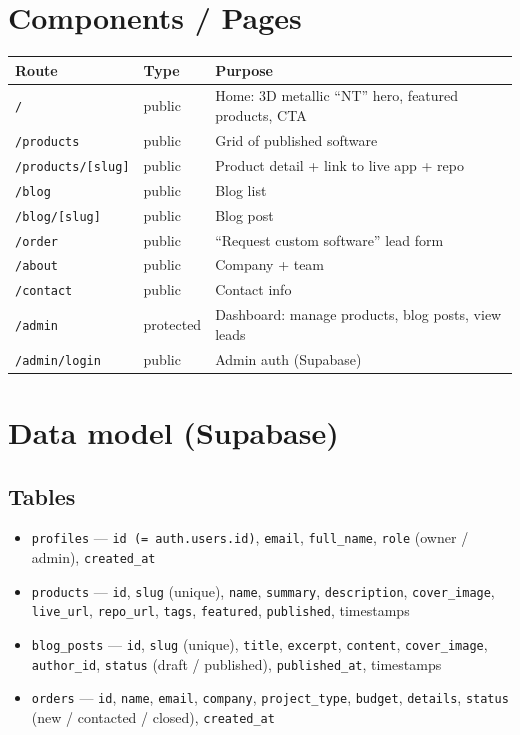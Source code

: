 \documentclass[11pt,a4paper]{article}
\begin{document}
\section{Components / Pages}
\begin{center}
\begin{tabularx}{\textwidth}{l l Y}
\toprule
\textbf{Route} & \textbf{Type} & \textbf{Purpose}\\
\midrule
\texttt{/} & public & Home: 3D metallic ``NT'' hero, featured products, CTA\\
\texttt{/products} & public & Grid of published software\\
\texttt{/products/[slug]} & public & Product detail + link to live app + repo\\
\texttt{/blog} & public & Blog list\\
\texttt{/blog/[slug]} & public & Blog post\\
\texttt{/order} & public & ``Request custom software'' lead form\\
\texttt{/about} & public & Company + team\\
\texttt{/contact} & public & Contact info\\
\texttt{/admin} & protected & Dashboard: manage products, blog posts, view leads\\
\texttt{/admin/login} & public & Admin auth (Supabase)\\
\bottomrule
\end{tabularx}
\end{center}

\section{Data model (Supabase)}
\subsection{Tables}
\begin{itemize}
  \item \texttt{profiles} --- \texttt{id (= auth.users.id)}, \texttt{email}, \texttt{full\_name},
        \texttt{role} (owner / admin), \texttt{created\_at}
  \item \texttt{products} --- \texttt{id}, \texttt{slug} (unique), \texttt{name}, \texttt{summary},
        \texttt{description}, \texttt{cover\_image}, \texttt{live\_url}, \texttt{repo\_url},
        \texttt{tags}, \texttt{featured}, \texttt{published}, timestamps
  \item \texttt{blog\_posts} --- \texttt{id}, \texttt{slug} (unique), \texttt{title}, \texttt{excerpt},
        \texttt{content}, \texttt{cover\_image}, \texttt{author\_id}, \texttt{status}
        (draft / published), \texttt{published\_at}, timestamps
  \item \texttt{orders} --- \texttt{id}, \texttt{name}, \texttt{email}, \texttt{company},
        \texttt{project\_type}, \texttt{budget}, \texttt{details}, \texttt{status}
        (new / contacted / closed), \texttt{created\_at}
\end{itemize}
\end{document}
